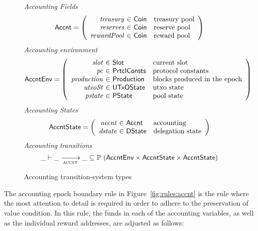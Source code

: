 \begin{figure}[htb]
  \emph{Accounting Fields}
  \begin{equation*}
    \Accnt =
    \left(
      \begin{array}{r@{~\in~}ll}
        \var{treasury} & \Coin & \text{treasury pool}\\
        \var{reserves} & \Coin & \text{reserve pool}\\
        \var{rewardPool} & \Coin & \text{reward pool}\\
      \end{array}
    \right)
  \end{equation*}
  \emph{Accounting environment}
  \begin{equation*}
    \AccntEnv =
    \left(
      \begin{array}{r@{~\in~}ll}
        \var{slot} & \Slot & \text{current slot}\\
        \var{pc} & \PrtclConsts & \text{protocol constants}\\
        \var{production} & \Production & \text{blocks produced in the epoch}\\
        \var{utxoSt} & \UTxOState & \text{utxo state}\\
        \var{pstate} & \PState & \text{pool state}\\
      \end{array}
    \right)
  \end{equation*}
  \emph{Accounting States}
  \begin{equation*}
    \AccntState =
    \left(
      \begin{array}{r@{~\in~}ll}
        \var{accnt} & \Accnt & \text{accounting}\\
        \var{dstate} & \DState & \text{delegation state}\\
      \end{array}
    \right)
  \end{equation*}
  \emph{Accounting transitions}
  \begin{equation*}
    \_ \vdash
    \var{\_} \trans{accnt}{} \var{\_}
    \subseteq \powerset (\AccntEnv \times \AccntState \times \AccntState)
  \end{equation*}
  \caption{Accounting transition-system types}
  \label{fig:ts-types:accnt}
\end{figure}


The accounting epoch boundary rule in Figure~\ref{fig:rules:accnt} is the rule
where the most attention to detail is required in order to adhere to the
preservation of value condition. In this rule, the funds in each of the
accounting variables, as well as the individual reward addresses, are adjusted
as follows:

